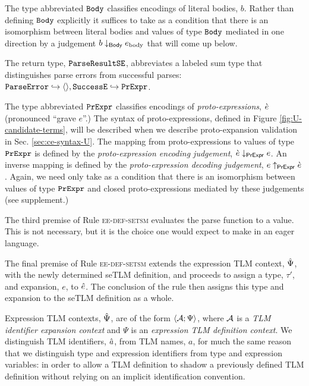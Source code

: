 \documentclass[acmsmall,review,anonymous]{acmart}\settopmatter{printfolios=true,printccs=false,printacmref=false}
\begin{document}
The type abbreviated $\mathtt{Body}$ classifies encodings of literal bodies, $b$. Rather than defining $\mathtt{Body}$ explicitly it suffices to take as a condition that there is an isomorphism between literal bodies and values of type $\mathtt{Body}$ mediated in one direction by a judgement $b \downarrow_\mathsf{Body} e_\text{body}$ that will come up below.

The return type, $\mathtt{ParseResultSE}$, abbreviates a labeled sum type that distinguishes parse errors from successful parses:
{$
  \mathtt{ParseError} \hookrightarrow \langle  \rangle, 
  \mathtt{SuccessE} \hookrightarrow \mathtt{PrExpr}
$}.

The type abbreviated $\mathtt{PrExpr}$ classifies encodings of \emph{proto-expressions}, $\grave{e}$ (pronounced ``grave $e$''.) The syntax of proto-expressions, defined in Figure \ref{fig:U-candidate-terms}, will be described when we describe proto-expansion validation in Sec. \ref{sec:ce-syntax-U}. The mapping from proto-expressions to values of type $\mathtt{PrExpr}$ is defined by the \emph{proto-expression encoding judgement}, $\grave{e} \downarrow_\mathsf{PrExpr} e$. An inverse mapping is defined by the \emph{proto-expression decoding judgement}, $e \uparrow_\mathsf{PrExpr} \grave{e}$. Again, we need only take as a condition that there is an isomorphism between values of type $\mathtt{PrExpr}$ and closed proto-expressions mediated by these judgements (see supplement.)

The third premise of Rule \textsc{ee-def-setsm} evaluates the parse function to a value. This is not necessary, but it is the choice one would expect to make in an eager language.

The final premise of Rule \textsc{ee-def-setsm} extends the expression TLM context, $\hat{\Psi}$, with the newly determined {seTLM definition}, and proceeds to assign a type, $\tau'$, and expansion, $e$, to ${\hat e}$. The conclusion of the rule then assigns this type and expansion to the seTLM definition as a whole. %

{Expression TLM contexts}, $\hat{\Psi}$, are of the form $\langle \mathcal{A}; \Psi \rangle$, where $\mathcal{A}$ is a \emph{TLM identifier expansion context} and $\Psi$ is an \emph{expression TLM definition context}. We distinguish TLM identifiers, $\hat{a}$, from TLM names, $a$, for much the same reason that we distinguish type and expression identifiers from type and expression variables: in order to allow a TLM definition to shadow a previously defined TLM definition without relying on an implicit identification convention.
\end{document}
